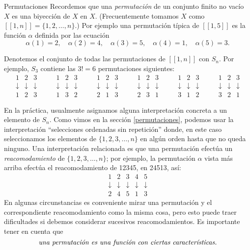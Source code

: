\documentclass[11pt,spanish,makeidx]{amsbook}
\theoremstyle{definition}
\theoremstyle{remark}
\begin{document}
\begin{section}{Permutaciones}
Recordemos  que una { {\em permutación}} de un conjunto finito no vacío $X$ es una biyección de $X$ en $X$. (Frecuentemente tomamos $X$ como $ [[1,n]]=\{1,2,\ldots,n\}$.) Por ejemplo una permutación típica de $[[1,5]]$ es la función $\alpha$ definida por las ecuación
$$
\alpha(1)=2,\quad \alpha(2)=4,\quad \alpha(3)=5,\quad
\alpha(4)=1,\quad \alpha(5)=3.
$$

Denotemos el conjunto de todas las permutaciones de $[[1,n]]$ con $S_n$. Por ejemplo, $S_3$ contiene las $3!=6$ permutaciones siguientes:
$$
\begin{matrix} 1&2&3 \\ \downarrow&\downarrow&\downarrow\\1 &2 &
3\end{matrix}\qquad
\begin{matrix} 1&2&3 \\ \downarrow&\downarrow&\downarrow\\1 &3 &2 \end{matrix}\qquad
\begin{matrix} 1&2&3 \\ \downarrow&\downarrow&\downarrow\\2 & 1&3 \end{matrix}
\qquad
\begin{matrix} 1&2&3 \\ \downarrow&\downarrow&\downarrow\\2 & 3&1
\end{matrix}\qquad
\begin{matrix} 1&2&3 \\
\downarrow&\downarrow&\downarrow\\3 &1 &2 \end{matrix}\qquad
\begin{matrix} 1&2&3 \\ \downarrow&\downarrow&\downarrow\\3 &2 &1
\end{matrix}
$$

En la práctica, usualmente asignamos alguna interpretación concreta a un elemento de $S_n$. Como vimos en la sección \ref{permutaciones}, podemos usar la interpretación ``selecciones ordenadas sin repetición''   donde, en este caso seleccionamos los elementos de $\{1,2,3,\ldots,n\}$ en algún orden hasta que no queda ninguno. Una interpretación relacionada es que una permutación efectúa un {\it reacomodamiento} de $\{1,2,3,\ldots,n\}$; por ejemplo, la permutación $\alpha$ vista más arriba efectúa el reacomodamiento de 12345, en 24513, así:
$$
\begin{matrix} 1&2&3&4&5 \\
\downarrow&\downarrow&\downarrow&\downarrow&\downarrow\\2 &4 &5 &1
& 3
\end{matrix}
$$
En algunas circunstancias es conveniente mirar una permutación y el correspondiente reacomodamiento como la misma cosa, pero esto puede traer dificultades si debemos considerar sucesivos reacomodamientos. Es importante tener en cuenta que 
$$
\text{\it una permutación es una función con ciertas características.}
$$


\end{section}
\end{document}
